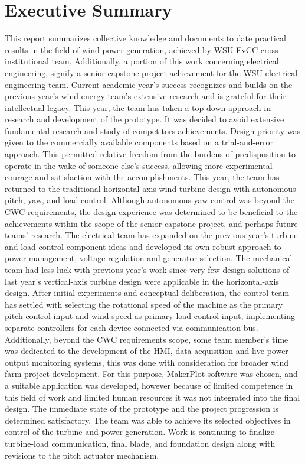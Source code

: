 \documentclass[../ewet_cwc_report.tex]{subfiles}
\begin{document}
\section*{Executive Summary}
\label{sec:summary}

\noindent
This report summarizes collective knowledge and documents to
date practical results in the field of wind power generation,
achieved by WSU-EvCC cross institutional team. Additionally, a
portion of this work concerning electrical engineering, signify
a senior capstone project achievement for the WSU electrical
engineering team. Current academic year's success recognizes
and builds on the previous year's wind energy team's extensive
research and is grateful for their intellectual legacy. This
year, the team has taken a top-down approach in research and
development of the prototype. It was decided to avoid extensive
fundamental research and study of competitors achievements.
Design priority was given to the commercially available
components based on a trial-and-error approach. This permitted
relative freedom from the burdens of predisposition to operate
in the wake of someone else's success, allowing more
experimental courage and satisfaction with the accomplishments.
This year, the team has returned to the traditional
horizontal-axis wind turbine design with autonomous pitch, yaw,
and load control. Although autonomous yaw control was beyond
the CWC requirements, the design experience was determined to
be beneficial to the achievements within the scope of the
senior capstone project, and perhaps future teams' research.
The electrical team has expanded on the previous year's turbine
and load control component ideas and developed its own robust
approach to power management, voltage regulation and generator
selection. The mechanical team had less luck with previous
year's work since very few design solutions of last year's
vertical-axis turbine design were applicable in the
horizontal-axis design. After initial experiments and
conceptual deliberation, the control team has settled with
selecting the rotational speed of the machine as the primary
pitch control input and wind speed as primary load control
input, implementing separate controllers for each device
connected via communication bus. Additionally, beyond the CWC
requirements scope, some team member's time was dedicated to
the development of the HMI, data acquisition and live power
output monitoring systems, this was done with consideration
for broader wind farm project development. For this purpose,
MakerPlot software was chosen, and a suitable application was
developed, however because of limited competence in this field
of work and limited human resources it was not integrated into
the final design. The immediate state of the prototype and the
project progression is determined satisfactory. The team was
able to achieve its selected objectives in control of the
turbine and power generation. Work is continuing to finalize
turbine-load communication, final blade, and foundation design
along with revisions to the pitch actuator mechanism.
\end{document}
